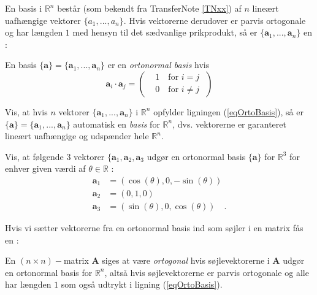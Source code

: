 En basis i $\mathbb{R}^{n}$ består (som bekendt fra TransferNote \ref{TNxx}) af $n$ lineært uafhængige vektorer $\{a_{1}, . . . , a_{n}\}$. Hvis vektorerne derudover er parvis ortogonale og har længden $1$ med hensyn til det sædvanlige prikprodukt, så er $\{\mathbf{a}_{1}, . . . , \mathbf{a}_{n}\}$ en  :

\begin{definition} \label{defOrtoBasis}
En basis $\{\mathbf{a}\} = \{ \mathbf{a}_{1}, . . . , \mathbf{a}_{n} \}$ er en {\em{ortonormal basis}} hvis
\begin{equation} \label{eqOrtoBasis}
\mathbf{a}_{i} \cdot \mathbf{a}_{j} = \left(\begin{aligned} & 1 \quad \textrm{for $i = j$} \\ & 0 \quad \textrm{for $i \neq j$}\end{aligned}\, \, \right)
\end{equation}
\end{definition}

\begin{exercise}
Vis, at hvis $n$ vektorer $\{ \mathbf{a}_{1}, . . . , \mathbf{a}_{n} \}$ i $\mathbb{R}^{n}$ opfylder ligningen (\ref{eqOrtoBasis}), så er
$\{\mathbf{a}\} = \{ \mathbf{a}_{1}, . . . , \mathbf{a}_{n} \}$ automatisk en {\em{basis}} for $\mathbb{R}^{n}$, dvs. vektorerne er garanteret lineært uafhængige og udspænder hele $\mathbb{R}^{n}$.
\end{exercise}


\begin{example} \label{exampRotBasis}
Vis, at følgende $3$ vektorer $\{\mathbf{a}_{1}, \mathbf{a}_{2}, \mathbf{a}_{3}$ udgør en ortonormal basis $\{\mathbf{a}\}$ for $\mathbb{R}^{3}$  for enhver given værdi af
$\theta \in \mathbb{R}$ :
\begin{equation}
\begin{aligned}
\mathbf{a}_{1} &= (\cos(\theta), 0 , -\sin(\theta)) \\
\mathbf{a}_{2} &= (0, 1, 0) \\
\mathbf{a}_{3} &= (\sin(\theta), 0, \cos(\theta)) \quad .
\end{aligned}
\end{equation}
\end{example}

Hvis vi sætter vektorerne fra en ortonormal basis ind som søjler i en matrix fås en :

\begin{definition}
En $(n \times n)-$matrix $\mathbf{A}$ siges at være {\em{ortogonal}} hvis søjlevektorerne i $\mathbf{A}$ udgør en
ortonormal basis for  $\mathbb{R}^{n}$, altså hvis søjlevektorerne er parvis ortogonale og alle har længden $1$ som også udtrykt i ligning (\ref{eqOrtoBasis}).
\end{definition}

